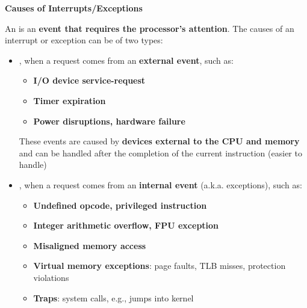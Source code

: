 \begin{flushleft}
    \textcolor{Red3}{ \textbf{Causes of Interrupts/Exceptions}}
\end{flushleft}
An  is an \textbf{event that requires the processor's attention}. The causes of an interrupt or exception can be of two types:
\begin{itemize}
    \item {}, when a request comes from an \textbf{external event}, such as:
    \begin{itemize}
        \item \textbf{I/O device service-request}
        \item \textbf{Timer expiration}
        \item \textbf{Power disruptions, hardware failure}
    \end{itemize}
    These events are caused by \textbf{devices external to the CPU and memory} and can be handled after the completion of the current instruction (easier to handle)

    \item {}, when a request comes from an \textbf{internal event} (a.k.a. exceptions), such as:
    \begin{itemize}
        \item \textbf{Undefined opcode, privileged instruction}
        \item \textbf{Integer arithmetic overflow, FPU exception}
        \item \textbf{Misaligned memory access}
        \item \textbf{Virtual memory exceptions}: page faults, TLB misses, protection violations
        \item \textbf{Traps}: system calls, e.g., jumps into kernel
    \end{itemize}
\end{itemize}

\newpage

